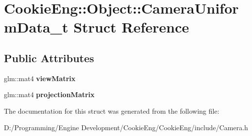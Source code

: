 \hypertarget{struct_cookie_eng_1_1_object_1_1_camera_uniform_data__t}{}\section{Cookie\+Eng\+:\+:Object\+:\+:Camera\+Uniform\+Data\+\_\+t Struct Reference}
\label{struct_cookie_eng_1_1_object_1_1_camera_uniform_data__t}
\subsection*{Public Attributes}
\begin{DoxyCompactItemize}
\item 
\mbox{\label{struct_cookie_eng_1_1_object_1_1_camera_uniform_data__t_a797bc47c37cef287171e818740440a51}} 
glm\+::mat4 {\bfseries view\+Matrix}
\item 
\mbox{\label{struct_cookie_eng_1_1_object_1_1_camera_uniform_data__t_a6e9902a5fbab068a5547e4802240f9b8}} 
glm\+::mat4 {\bfseries projection\+Matrix}
\end{DoxyCompactItemize}


The documentation for this struct was generated from the following file\+:\begin{DoxyCompactItemize}
\item 
D\+:/\+Programming/\+Engine Development/\+Cookie\+Eng/\+Cookie\+Eng/include/Camera.\+h\end{DoxyCompactItemize}

